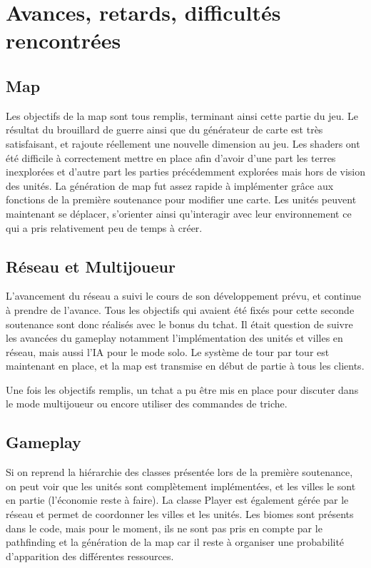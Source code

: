 \documentclass[12pt]{report}
\begin{document}
\chapter{Avances, retards, difficultés rencontrées}

\section*{Map}

Les objectifs de la map sont tous remplis, terminant ainsi cette partie du jeu.
Le résultat du brouillard de guerre ainsi que du générateur de carte est très
satisfaisant, et rajoute réellement une nouvelle dimension au jeu. Les shaders
ont été difficile à correctement mettre en place afin d'avoir d'une part les
terres inexplorées et d'autre part les parties précédemment explorées mais hors
de vision des unités. La génération de map fut assez rapide à implémenter grâce
aux fonctions de la première soutenance pour modifier une carte. Les unités
peuvent maintenant se déplacer, s'orienter ainsi qu'interagir avec leur
environnement ce qui a pris relativement peu de temps à créer.

\section*{Réseau et Multijoueur}

L’avancement du réseau a suivi le cours de son développement prévu, et continue
à prendre de l'avance. Tous les objectifs qui avaient été fixés pour cette
seconde soutenance sont donc réalisés avec le bonus du tchat. Il était question
de suivre les avancées du gameplay notamment l'implémentation des unités et
villes en réseau, mais aussi l'IA pour le mode solo. Le système de tour par tour
est maintenant en place, et la map est transmise en début de partie à tous les
clients.

Une fois les objectifs remplis, un tchat a pu être mis en place pour discuter
dans le mode multijoueur ou encore utiliser des commandes de triche.

\section*{Gameplay}

Si on reprend la hiérarchie des classes présentée lors de la première
soutenance, on peut voir que les unités sont complètement implémentées, et les
villes le sont en partie (l’économie reste à faire). La classe Player est
également gérée par le réseau et permet de coordonner les villes et les unités.
Les biomes sont présents dans le code, mais pour le moment, ils ne sont pas
pris en compte par le pathfinding et la génération de la map car il reste à
organiser une probabilité d’apparition des différentes ressources.
\end{document}

